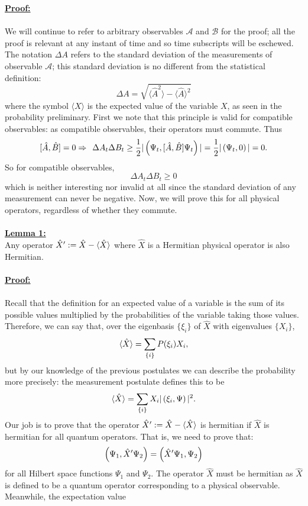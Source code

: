 \underline{\textbf{Proof:}}\\\\
We will continue to refer to arbitrary observables $\mathcal{A}$ and $\mathcal{B}$ for the proof; all the proof is relevant at any instant of time and so time subscripts will be eschewed. The notation $\Delta A$ refers to the standard deviation of the measurements of observable $\mathcal{A}$; this standard deviation is no different from the statistical definition:
$$
\Delta A=\sqrt{\langle \hat{A}^2\rangle-\langle \hat{A}\rangle^2}
$$
where the symbol $\langle X\rangle$ is the expected value of the variable $X$, as seen in the probability preliminary. First we note that this principle is valid for compatible observables: as compatible observables, their operators must commute. Thus
$$
[\hat{A},\hat{B}]=0 \Rightarrow\:\: \Delta A_{t}\Delta B_{t}\geq\frac{1}{2}|\left(\Psi_{t},[\hat{A},\hat{B}]\Psi_{t}\right)| = \frac{1}{2}|\left(\Psi_{t},0\right) |=0. 
$$
So for compatible observables, 
$$
\Delta A_{t}\Delta B_{t}\geq 0
$$
which is neither interesting nor invalid at all since the standard deviation of any measurement can never be negative. Now, we will prove this for all physical operators, regardless of whether they commute.
\\\\
\underline{\textbf{Lemma 1:}}\\
Any operator $\hat{X}':=\hat{X}-\langle\hat{X}\rangle$ where $\hat{X}$ is a Hermitian physical operator is also Hermitian.\\\\
\underline{\textbf{Proof:}}\\\\
Recall that the definition for an expected value of a variable is the sum of its possible values multiplied by the probabilities of the variable taking those values. Therefore, we can say that, over the eigenbasis $\{\xi_{i}\}$ of $\hat{X}$ with eigenvalues $\{X_{i}\}$, 
$$
\langle\hat{X}\rangle=\sum_{\{i\}}P(\xi_{i})X_{i},
$$
but by our knowledge of the previous postulates we can describe the probability more precisely: the measurement postulate defines this to be
$$
\langle\hat{X}\rangle=\sum_{\{i\}}X_{i}|\left(\xi_{i},\Psi\right)|^2.
$$
Our job is to prove that the operator $\hat{X}':=\hat{X}-\langle\hat{X}\rangle$ is hermitian if $\hat{X}$ is hermitian for all quantum operators. That is, we need to prove that:
$$
\left(\Psi_{1},\hat{X}'\Psi_{2}\right)=\left(\hat{X}'\Psi_{1},\Psi_{2}\right)
$$
for all Hilbert space functions $\Psi_{1}$ and $\Psi_{2}$. The operator $\hat{X}$ must be hermitian as $\hat{X}$ is defined to be a quantum operator corresponding to a physical observable. Meanwhile, the expectation value
